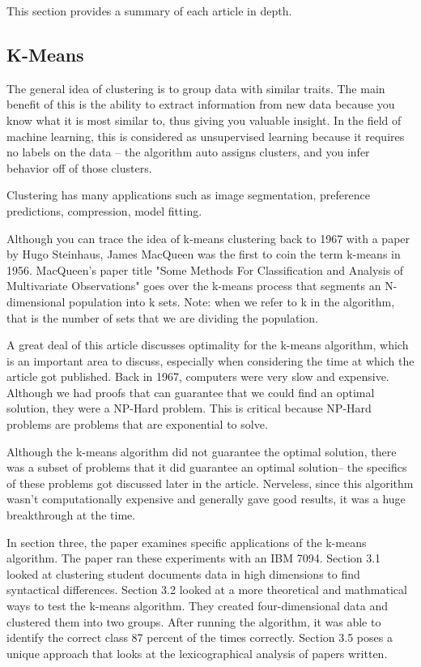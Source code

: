 \documentclass[12pt]{apa6}
\begin{document}
This section provides a summary of each article in depth.

\subsection{K-Means}


The general idea of clustering is to group data with similar traits. The main benefit of this is the ability to extract information from new data because you know what it is most similar to, thus giving you valuable insight. In the field of machine learning, this is considered as unsupervised learning because it requires no labels on the data -- the algorithm auto assigns clusters, and you infer behavior off of those clusters.

Clustering has many applications such as image segmentation, preference predictions, compression, model fitting.


Although you can trace the idea of k-means clustering back to 1967 with a paper by Hugo Steinhaus\cite{ogClustering}, James MacQueen was the first to coin the term k-means in 1956\cite{k-means}. MacQueen's paper title "Some Methods For Classification and Analysis of Multivariate Observations" goes over the k-means process that segments an N-dimensional population into k sets. Note: when we refer to k in the algorithm, that is the number of sets that we are dividing the population.


A great deal of this article discusses optimality for the k-means algorithm, which is an important area to discuss, especially when considering the time at which the article got published. Back in 1967, computers were very slow and expensive. Although we had proofs that can guarantee that we could find an optimal solution, they were a NP-Hard problem\cite{np-hard}. This is critical because NP-Hard problems are problems that are exponential to solve.

Although the k-means algorithm did not guarantee the optimal solution, there was a subset of problems that it did guarantee an optimal solution-- the specifics of these problems got discussed later in the article. Nerveless, since this algorithm wasn't computationally expensive and generally gave good results, it was a huge breakthrough at the time. 

In section three, the paper examines specific applications of the k-means algorithm. The paper ran these experiments with an IBM 7094. Section 3.1 looked at clustering student documents data in high dimensions to find syntactical differences. Section 3.2 looked at a more theoretical and mathmatical ways to test the k-means algorithm. They created four-dimensional data and clustered them into two groups. After running the algorithm, it was able to identify the correct class 87 percent of the times correctly. 
Section 3.5 poses a unique approach that looks at the lexicographical analysis of papers written. 
\end{document}
